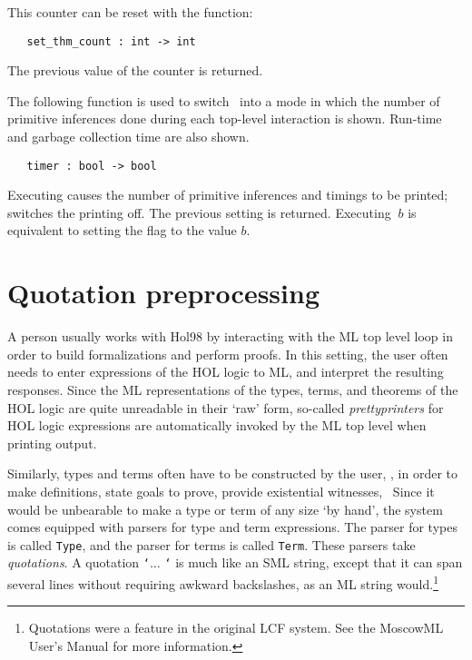 \noindent This counter can be reset with the function:

\begin{boxed}
\begin{verbatim}
   set_thm_count : int -> int
\end{verbatim}\end{boxed}

\noindent The previous value of the counter is returned.

The following function is used to switch \ML\ into a  mode in  which the number
of primitive inferences done during each top-level interaction is  shown.
Run-time and garbage collection time are also shown.

\begin{boxed}
\begin{verbatim}
   timer : bool -> bool
\end{verbatim}\end{boxed}

\noindent Executing  causes  the number  of primitive inferences
and timings to be  printed;  switches  the printing  off.  The
previous setting  is
returned.    Executing  $\ b$  is equivalent to
setting the flag  to the value $b$.


\section{Quotation preprocessing}

A person usually works with Hol98 by interacting with the ML top level
loop in order to build formalizations and perform proofs. In this
setting, the user often needs to enter expressions of the HOL logic to
ML, and interpret the resulting responses. Since the ML representations
of the types, terms, and theorems of the HOL logic are quite unreadable
in their `raw' form, so-called {\it prettyprinters\/} for HOL logic
expressions are automatically invoked by the ML top level when printing
output.
 
Similarly, types and terms often have to be constructed by the user,
\eg, in order to make definitions, state goals to prove, provide
existential witnesses, \etc\ Since it would be unbearable to make a type
or term of any size `by hand', the system comes equipped with parsers
for type and term expressions. The parser for types is called
\verb+Type+, and the parser for terms is called \verb+Term+. These
parsers take {\it quotations\/}.  A quotation {\tt `}$\ldots$ {\tt `} is
much like an SML string, except that it can span several lines without
requiring awkward backslashes, as an ML string
would.\footnote{Quotations were a feature in the original LCF
system. See the MoscowML User's Manual for more information.}

